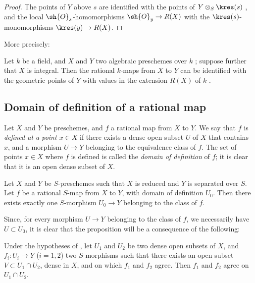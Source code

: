 \begin{proof}
The points of $Y$ above $s$ are identified with the points of $Y\otimes_S\kres(s)$ , and the local $\sh{O}_s$-homomorphisms $\sh{O}_y\to R(X)$ with the $\kres(s)$-monomorphisms $\kres(y)\to R(X)$.
\end{proof}

More precisely:
\begin{corollary}[7.1.16]
\label{I.7.1.16}
Let $k$ be a field, and $X$ and $Y$ two algebraic preschemes over $k$ ; suppose further that $X$ is integral.
Then the rational $k$-maps from $X$ to $Y$ can be identified with the geometric points of $Y$ with values in the extension $R(X)$ of $k$ .
\end{corollary}

\subsection{Domain of definition of a rational map}
\label{subsection:I.7.2}
\label{I.7.2}

\begin{env}[7.2.1]
\label{I.7.2.1}
Let $X$ and $Y$ be preschemes, and $f$ a rational map from $X$ to $Y$.
We say that $f$ is \emph{defined at a point $x\in X$} if there exists a dense open subset $U$ of $X$ that contains $x$, and a morphism $U\to Y$ belonging to the equivalence class of $f$.
The set of points $x\in X$ where $f$ is defined is called the \emph{domain of definition} of $f$; it is clear that it is an open dense subset of $X$.
\end{env}

\begin{proposition}[7.2.2]
\label{I.7.2.2}
Let $X$ and $Y$ be $S$-preschemes such that $X$ is reduced and $Y$ is separated over $S$.
Let $f$ be a rational $S$-map from $X$ to $Y$, with domain of definition $U_0$.
Then there exists exactly one $S$-morphism $U_0\to Y$ belonging to the class of $f$.
\end{proposition}

Since, for every morphism $U\to Y$ belonging to the class of $f$, we necessarily have $U\subset U_0$, it is clear that the proposition will be a consequence of the following:

\begin{lemma}[7.2.2.1]
\label{I.7.2.2.1}
Under the hypotheses of , let $U_1$ and $U_2$ be two dense open subsets of $X$, and $f_i:U_i\to Y$ ($i=1,2$) two $S$-morphisms such that there exists an open subset $V\subset U_1\cap U_2$, dense in $X$, and on which $f_1$ and $f_2$ agree.
Then $f_1$ and $f_2$ agree on $U_1\cap U_2$.
\end{lemma}

